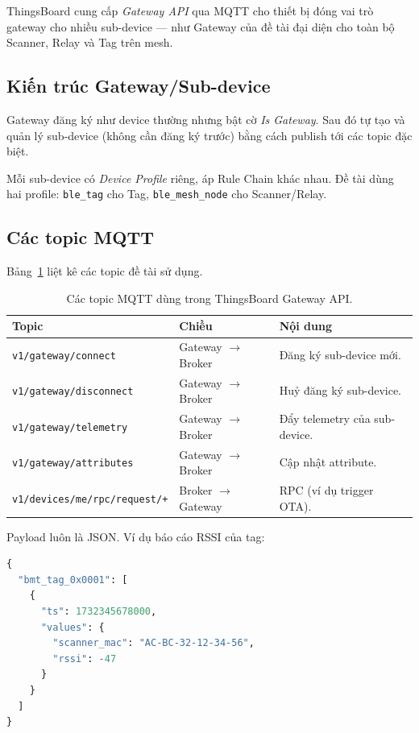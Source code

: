 ThingsBoard cung cấp \textit{Gateway API} qua MQTT cho thiết bị đóng vai trò gateway cho nhiều sub-device --- như Gateway của đề tài đại diện cho toàn bộ Scanner, Relay và Tag trên mesh.

\subsection{Kiến trúc Gateway/Sub-device}

Gateway đăng ký như device thường nhưng bật cờ \textit{Is Gateway}. Sau đó tự tạo và quản lý sub-device (không cần đăng ký trước) bằng cách publish tới các topic đặc biệt.

Mỗi sub-device có \textit{Device Profile} riêng, áp Rule Chain khác nhau. Đề tài dùng hai profile: \texttt{ble\_tag} cho Tag, \texttt{ble\_mesh\_node} cho Scanner/Relay.

\subsection{Các topic MQTT}

Bảng~\ref{tab:mqtt-topics} liệt kê các topic đề tài sử dụng.

\begin{table}[htp]
    \centering
    \caption{Các topic MQTT dùng trong ThingsBoard Gateway API.}
    \label{tab:mqtt-topics}
    \begin{tabular}{lll}
        \hline
        \textbf{Topic} & \textbf{Chiều} & \textbf{Nội dung} \\
        \hline
        \texttt{v1/gateway/connect}                & Gateway $\to$ Broker & Đăng ký sub-device mới. \\
        \texttt{v1/gateway/disconnect}             & Gateway $\to$ Broker & Huỷ đăng ký sub-device. \\
        \texttt{v1/gateway/telemetry}              & Gateway $\to$ Broker & Đẩy telemetry của sub-device. \\
        \texttt{v1/gateway/attributes}             & Gateway $\to$ Broker & Cập nhật attribute. \\
        \texttt{v1/devices/me/rpc/request/+}       & Broker $\to$ Gateway & RPC (ví dụ trigger OTA). \\
        \hline
    \end{tabular}
\end{table}

Payload luôn là JSON. Ví dụ báo cáo RSSI của tag:

\begin{lstlisting}[language=Python,caption=Payload telemetry gửi tới v1/gateway/telemetry]
{
  "bmt_tag_0x0001": [
    {
      "ts": 1732345678000,
      "values": {
        "scanner_mac": "AC-BC-32-12-34-56",
        "rssi": -47
      }
    }
  ]
}
\end{lstlisting}

